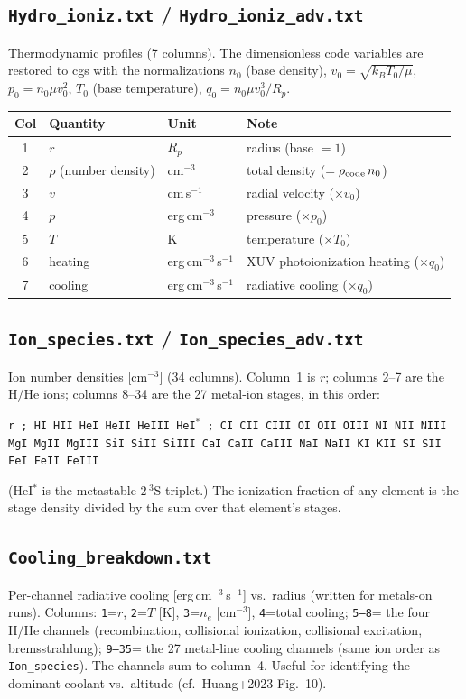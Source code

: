 \documentclass[english,a4paper]{kiseon_memo}
\newcommand{\rp}{$R_p$}
\begin{document}
\subsection{\texttt{Hydro\_ioniz.txt} / \texttt{Hydro\_ioniz\_adv.txt}}
Thermodynamic profiles (7 columns). The dimensionless code variables are
restored to cgs with the normalizations $n_0$ (base density), $v_0=\sqrt{k_BT_0/\mu}$,
$p_0=n_0\mu v_0^2$, $T_0$ (base temperature), $q_0=n_0\mu v_0^3/R_p$.

\begin{center}\small
\begin{tabular}{@{}clll@{}}
\toprule
Col & Quantity & Unit & Note \\
\midrule
1 & $r$ & \rp & radius (base $=1$) \\
2 & $\rho$ (number density) & cm$^{-3}$ & total density ($=\rho_{\rm code}\,n_0$) \\
3 & $v$ & cm\,s$^{-1}$ & radial velocity ($\times v_0$) \\
4 & $p$ & erg\,cm$^{-3}$ & pressure ($\times p_0$) \\
5 & $T$ & K & temperature ($\times T_0$) \\
6 & heating & erg\,cm$^{-3}$\,s$^{-1}$ & XUV photoionization heating ($\times q_0$) \\
7 & cooling & erg\,cm$^{-3}$\,s$^{-1}$ & radiative cooling ($\times q_0$) \\
\bottomrule
\end{tabular}
\end{center}

\subsection{\texttt{Ion\_species.txt} / \texttt{Ion\_species\_adv.txt}}
Ion number densities [cm$^{-3}$] (34 columns). Column~1 is $r$; columns 2--7 are
the H/He ions; columns 8--34 are the 27 metal-ion stages, in this order:
\begin{center}\small
\texttt{r ;\ HI HII HeI HeII HeIII HeI$^*$ ;\ CI CII CIII OI OII OIII NI NII NIII
MgI MgII MgIII SiI SiII SiIII CaI CaII CaIII NaI NaII KI KII SI SII FeI FeII
FeIII}
\end{center}
(HeI$^*$ is the metastable $2\,^3$S triplet.) The ionization fraction of any
element is the stage density divided by the sum over that element's stages.

\subsection{\texttt{Cooling\_breakdown.txt}}
Per-channel radiative cooling [erg\,cm$^{-3}$\,s$^{-1}$] vs.\ radius (written for
metals-on runs). Columns: \texttt{1}=$r$, \texttt{2}=$T$ [K], \texttt{3}=$n_e$
[cm$^{-3}$], \texttt{4}=total cooling; \texttt{5--8}= the four H/He channels
(recombination, collisional ionization, collisional excitation, bremsstrahlung);
\texttt{9--35}= the 27 metal-line cooling channels (same ion order as
\texttt{Ion\_species}). The channels sum to column~4. Useful for identifying the
dominant coolant vs.\ altitude (cf.\ Huang+2023 Fig.~10).
\end{document}
